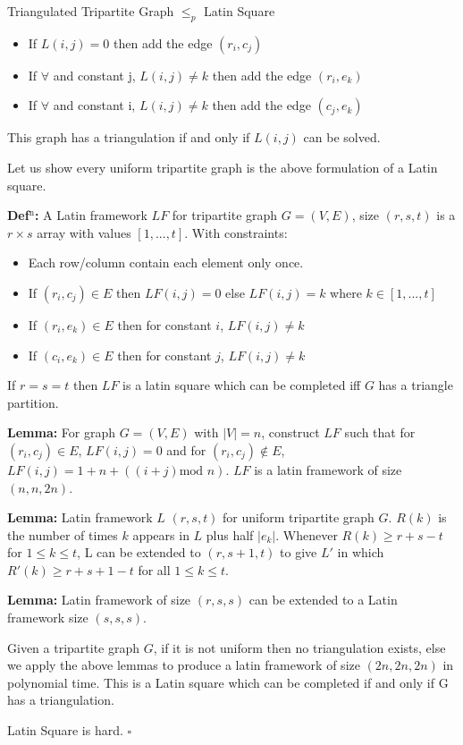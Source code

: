 \documentclass[final]{beamer}
\newlength{\colwidth}
\newcounter{row}
\newcounter{col}
\begin{document}
\begin{frame}[t]
\begin{columns}[t]
\begin{column}{\colwidth}
\begin{block}{Triangulated Tripartite Graph $\leq_p$ Latin Square \cite{COLBOURN198425}}
\begin{itemize}
\item{If $L(i,j) = 0$ then add the edge $(r_i,c_j)$ }
\item{If $\forall$ and constant j, $L(i,j) \neq k$ then add the edge $(r_i,e_k)$}
\item{If $\forall$ and constant i, $L(i,j) \neq k$ then add the edge $(c_j,e_k)$}
\end{itemize}
This graph has a triangulation if and only if $L(i,j)$ can be solved.

Let us show every uniform tripartite graph is the above formulation of a Latin square.

\textbf{Def$^{\text{n}}$:} A Latin framework $LF$ for tripartite graph $G=(V,E)$, size $(r,s,t)$ is a $r \times s$ array with values $[1,...,t]$. With constraints:
\begin{itemize}
\item{Each row/column contain each element only once.}
\item{If $(r_i,c_j)\in E$ then $LF(i,j)=0$ else $LF(i,j)= k$ where $k\in [1,...,t]$}
\item{If $(r_i,e_k)\in E$  then for constant $i$, $LF(i,j)\neq k$}
\item{If $(c_i,e_k)\in E$  then for constant $j$, $LF(i,j)\neq k$}
\end{itemize}
If $r=s=t$ then $LF$ is a latin square which can be completed iff $G$ has a triangle partition.

\textbf{Lemma:} For graph $G=(V,E)$ with $|V|=n$, construct $LF$ such that for $(r_i,c_j)\in E$, $LF(i,j)=0$ and for $(r_i,c_j)\not\in E$, $LF(i,j)=1+n+((i+j)\text{mod }n)$. $ LF$ is a latin framework of size $(n,n,2n)$. 

\textbf{Lemma:} Latin framework $L$  $(r,s,t)$ for uniform tripartite graph $G$. $R(k)$ is the number of times $k$ appears in $L$ plus half $|e_k|$. Whenever $R(k)\ge r+s-t$ for $1 \le k \le t$, L can be extended to $(r,s+1,t)$ to give $L'$ in which $R'(k)\ge r + s+1-t$ for all $1\le k \le t$.

\textbf{Lemma:} Latin framework of size $(r,s,s)$ can be extended to a Latin framework size $(s,s,s)$.

Given a tripartite graph $G$, if it is not uniform then no triangulation exists, else we apply the above lemmas to produce a latin framework of size $(2n,2n,2n)$ in polynomial time. This is a Latin square which can be completed if and only if G has a triangulation. 

Latin Square is hard. $\square$


\end{block}
\end{column}
\end{columns}
\end{frame}
\end{document}
